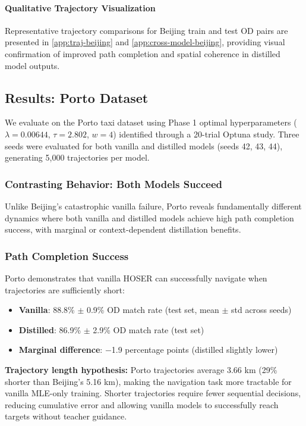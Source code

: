 \paragraph{Qualitative Trajectory Visualization}
Representative trajectory comparisons for Beijing train and test OD pairs are presented in \autoref{app:traj-beijing} and \autoref{app:cross-model-beijing}, providing visual confirmation of improved path completion and spatial coherence in distilled model outputs.

\subsection{Results: Porto Dataset}
\label{sec:eval-porto}

We evaluate on the Porto taxi dataset using Phase 1 optimal hyperparameters ($\lambda=0.00644$, $\tau=2.802$, $w=4$) identified through a 20-trial Optuna study. Three seeds were evaluated for both vanilla and distilled models (seeds 42, 43, 44), generating 5,000 trajectories per model.

\subsubsection{Contrasting Behavior: Both Models Succeed}

Unlike Beijing's catastrophic vanilla failure, Porto reveals fundamentally different dynamics where both vanilla and distilled models achieve high path completion success, with marginal or context-dependent distillation benefits.

\subsubsection{Path Completion Success}

Porto demonstrates that vanilla HOSER can successfully navigate when trajectories are sufficiently short:
\begin{itemize}[leftmargin=*,noitemsep]
    \item \textbf{Vanilla}: 88.8\% $\pm$ 0.9\% OD match rate (test set, mean $\pm$ std across seeds)
    \item \textbf{Distilled}: 86.9\% $\pm$ 2.9\% OD match rate (test set)
    \item \textbf{Marginal difference}: $-$1.9 percentage points (distilled slightly lower)
\end{itemize}

\textbf{Trajectory length hypothesis:} Porto trajectories average 3.66 km (29\% shorter than Beijing's 5.16 km), making the navigation task more tractable for vanilla MLE-only training. Shorter trajectories require fewer sequential decisions, reducing cumulative error and allowing vanilla models to successfully reach targets without teacher guidance.

